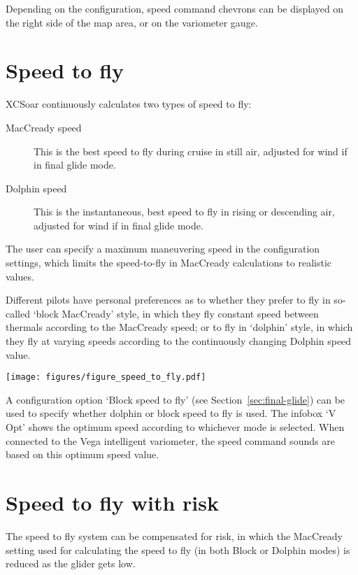 Depending on the configuration, speed command chevrons can be
displayed on the right side of the map area, or on the variometer
gauge.


\section{Speed to fly}\label{sec:stf}

XCSoar continuously calculates two types of speed to fly:
\begin{description}
\item[MacCready speed]  This is the best speed to fly during cruise
  in still air, adjusted for wind if in final glide mode.
\item[Dolphin speed]  This is the instantaneous, best speed to fly
  in rising or descending air, adjusted for wind if in final glide
  mode.
\end{description}  

The user can specify a maximum maneuvering speed in the configuration
settings, which limits the speed-to-fly in MacCready calculations to
realistic values.

Different pilots have personal preferences as to whether they prefer
to fly in so-called `block MacCready' style, in which they fly
constant speed between thermals according to the MacCready speed; or
to fly in `dolphin' style, in which they fly at varying speeds
according to the continuously changing Dolphin speed value.

\begin{maxipage}
\begin{center}
\texttt{[image: figures/figure\_speed\_to\_fly.pdf]}
\end{center}
\end{maxipage}

A configuration option `Block speed to fly' (see
Section~\ref{sec:final-glide}) can be used to specify whether dolphin
or block speed to fly is used.  The infobox `V Opt' shows the optimum
speed according to whichever mode is selected.  When connected to the
Vega intelligent variometer, the speed command sounds are based on
this optimum speed value.


\section{Speed to fly with risk}\label{sec:safety-factor}

  The speed to fly system can be compensated for risk, in which the
  MacCready setting used for calculating the speed to fly (in both
  Block or Dolphin modes) is reduced as the glider gets low.


